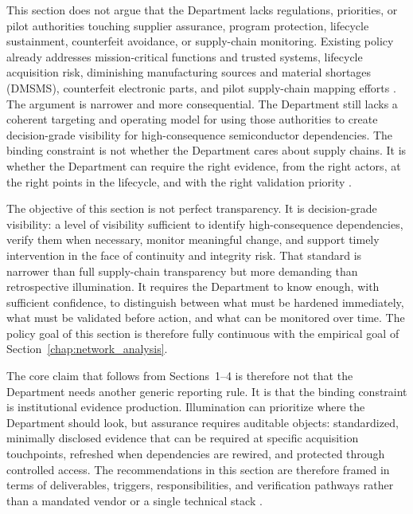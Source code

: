 This section does not argue that the Department lacks regulations, priorities, or pilot authorities touching supplier assurance, program protection, lifecycle sustainment, counterfeit avoidance, or supply-chain monitoring. Existing policy already addresses mission-critical functions and trusted systems, lifecycle acquisition risk, diminishing manufacturing sources and material shortages (DMSMS), counterfeit electronic parts, and pilot supply-chain mapping efforts \parencite{ch5_dodi520044,ch5_dodi500085,ch5_tpp_guidebook_2022,ch5_dodi424515,ch5_dmsms_contract_language_guidebook,ch5_dfars2522467007,ch5_dfars2522467008,ch5_dfars2522047020,ch5_ndaa2024_sec856}. The argument is narrower and more consequential. The Department still lacks a coherent targeting and operating model for using those authorities to create decision-grade visibility for high-consequence semiconductor dependencies. The binding constraint is not whether the Department cares about supply chains. It is whether the Department can require the right evidence, from the right actors, at the right points in the lifecycle, and with the right validation priority \parencite{ch5_dod2022_supplychains,U.S.GovernmentAccountabilityOffice2025}.

The objective of this section is not perfect transparency. It is decision-grade visibility: a level of visibility sufficient to identify high-consequence dependencies, verify them when necessary, monitor meaningful change, and support timely intervention in the face of continuity and integrity risk. That standard is narrower than full supply-chain transparency but more demanding than retrospective illumination. It requires the Department to know enough, with sufficient confidence, to distinguish between what must be hardened immediately, what must be validated before action, and what can be monitored over time. The policy goal of this section is therefore fully continuous with the empirical goal of Section~\ref{chap:network_analysis}.

The core claim that follows from Sections~1--4 is therefore not that the Department needs another generic reporting rule. It is that the binding constraint is institutional evidence production. Illumination can prioritize where the Department should look, but assurance requires auditable objects: standardized, minimally disclosed evidence that can be required at specific acquisition touchpoints, refreshed when dependencies are rewired, and protected through controlled access. The recommendations in this section are therefore framed in terms of deliverables, triggers, responsibilities, and verification pathways rather than a mandated vendor or a single technical stack \parencite{ch5_nist800161r1upd1,ch5_dodi520044}.


